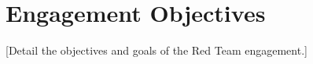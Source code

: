 \section{Engagement Objectives}
[Detail the objectives and goals of the Red Team engagement.]
\newpage
